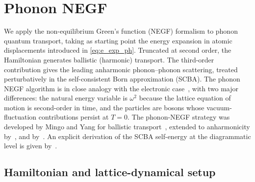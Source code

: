\section{Phonon NEGF}
\label{sec:ph_negf}

We apply the non-equilibrium Green's function (NEGF) formalism to phonon quantum transport,
taking as starting point the energy expansion in atomic displacements introduced in
\cref{eq:e_exp_ph}. Truncated at second order, the Hamiltonian generates
ballistic (harmonic) transport. The third-order contribution gives the
leading anharmonic phonon--phonon scattering, treated perturbatively in
the self-consistent Born approximation (SCBA). The phonon NEGF algorithm is
in close analogy with the electronic case~\cite{caroli_direct_1971,meir_landauer_1992,haug_quantum_2008,wang_quantum_2008, wang_nonequilibrium_2014},
with two major differences: the natural energy variable is
$\omega^2$ because the lattice equation of motion is second-order in
time, and the particles are bosons whose vacuum-fluctuation
contributions persist at $T = 0$. The phonon-NEGF strategy was developed
by Mingo and Yang for ballistic transport~\cite{mingo_calculation_2003, mingo_phonon_2003},
extended to anharmonicity by~\citet{mingo_anharmonic_2006, wang_nonequilibrium_2007},
and by~\cite{luisier_atomistic_2012,lee_anharmonic_2018}. An explicit derivation
of the SCBA self-energy at the diagrammatic level is given by~\citet{guo_quantum_2020}.

\subsection{Hamiltonian and lattice-dynamical setup}
\label{sub:ph_hamiltonian}


